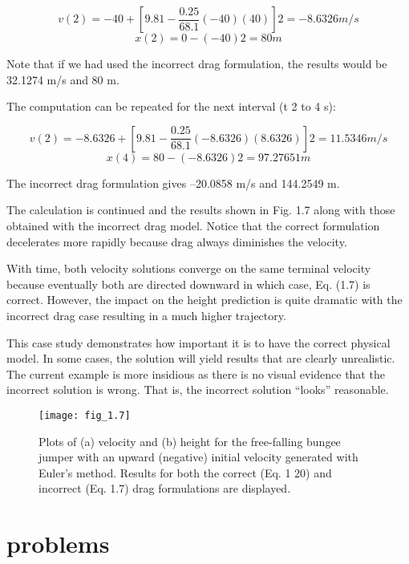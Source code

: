\documentclass[../main.tex]{subfiles}
\begin{document}
$$v(2)= -40 + \left[ 9.81 - \dfrac{0.25}{68.1}(-40)(40) \right]2= -8.6326 m/s $$
$$x(2)=0 - (-40)2=80 m$$

 Note that if we had used the incorrect drag formulation, the results would be 32.1274 m/s
and 80 m. 

The computation can be repeated for the next interval (t  2 to 4 s):

$$v(2)= -8.6326 + \left[ 9.81 - \dfrac{0.25}{68.1}(-8.6326)(8.6326) \right]2= 11.5346 m/s $$
$$x(4) =80 -(-8.6326)2=97.27651 m $$


The incorrect drag formulation gives –20.0858 m/s and 144.2549 m.


The calculation is continued and the results shown in Fig. 1.7 along with those
obtained with the incorrect drag model. Notice that the correct formulation decelerates
more rapidly because drag always diminishes the velocity.


With time, both velocity solutions converge on the same terminal velocity because
eventually both are directed downward in which case, Eq. (1.7) is correct. However, the
impact on the height prediction is quite dramatic with the incorrect drag case resulting in a
much higher trajectory.


This case study demonstrates how important it is to have the correct physical model.
In some cases, the solution will yield results that are clearly unrealistic. The current example is more insidious as there is no visual evidence that the incorrect solution is wrong. That
is, the incorrect solution “looks” reasonable.

\begin{figure}[H]
	\centering
	\texttt{[image: fig\_1.7]}
   \caption{\textsf{Plots of (a) velocity and (b) height for the free-falling bungee jumper with an upward (negative)
   initial velocity generated with Euler's method. Results for both the correct (Eq. 1 20) and incorrect
   (Eq. 1.7) drag formulations are displayed.}}
   \label{fig_1.}
\end{figure}

\section*{problems}
\end{document}
